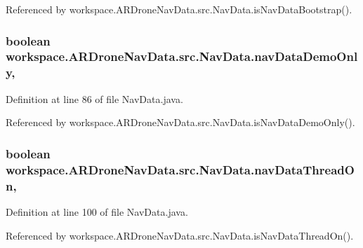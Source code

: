 Referenced by workspace.\+A\+R\+Drone\+Nav\+Data.\+src.\+Nav\+Data.\+is\+Nav\+Data\+Bootstrap().

\hypertarget{classworkspace_1_1_a_r_drone_nav_data_1_1src_1_1_nav_data_adc7cbba2a29fed4fb01651c52280d74d}{}
\subsubsection[{nav\+Data\+Demo\+Only}]{\setlength{\rightskip}{0pt plus 5cm}boolean workspace.\+A\+R\+Drone\+Nav\+Data.\+src.\+Nav\+Data.\+nav\+Data\+Demo\+Only\hspace{0.3cm}{\ttfamily [static]}, {\ttfamily [protected]}}\label{classworkspace_1_1_a_r_drone_nav_data_1_1src_1_1_nav_data_adc7cbba2a29fed4fb01651c52280d74d}


Definition at line 86 of file Nav\+Data.\+java.



Referenced by workspace.\+A\+R\+Drone\+Nav\+Data.\+src.\+Nav\+Data.\+is\+Nav\+Data\+Demo\+Only().

\hypertarget{classworkspace_1_1_a_r_drone_nav_data_1_1src_1_1_nav_data_addcbd13dfddbe24480fea2b0ac6fb981}{}
\subsubsection[{nav\+Data\+Thread\+On}]{\setlength{\rightskip}{0pt plus 5cm}boolean workspace.\+A\+R\+Drone\+Nav\+Data.\+src.\+Nav\+Data.\+nav\+Data\+Thread\+On\hspace{0.3cm}{\ttfamily [static]}, {\ttfamily [protected]}}\label{classworkspace_1_1_a_r_drone_nav_data_1_1src_1_1_nav_data_addcbd13dfddbe24480fea2b0ac6fb981}


Definition at line 100 of file Nav\+Data.\+java.



Referenced by workspace.\+A\+R\+Drone\+Nav\+Data.\+src.\+Nav\+Data.\+is\+Nav\+Data\+Thread\+On().

